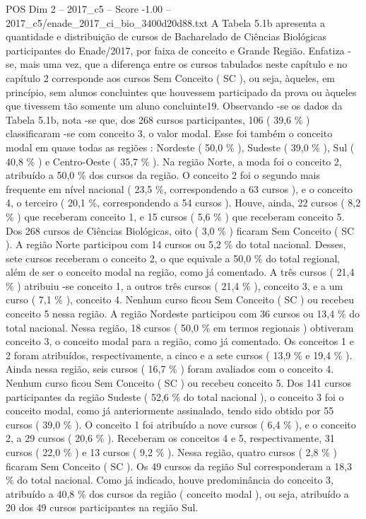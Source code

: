 \begin{textsample}{POS Dim 2 – 2017\_c5 – Score -1.00 – 2017\_c5/enade\_2017\_ci\_bio\_3400d20d88.txt}
A Tabela 5.1b apresenta a quantidade e distribuição de cursos de Bacharelado de Ciências Biológicas participantes do Enade/2017, por faixa de conceito e Grande Região.
Enfatiza -se, mais uma vez, que a diferença entre os cursos tabulados neste capítulo e no capítulo 2 corresponde aos cursos Sem Conceito ( SC ), ou seja, àqueles, em princípio, sem alunos concluintes que houvessem participado da prova ou àqueles que tivessem tão somente um aluno concluinte19.
Observando -se os dados da Tabela 5.1b, nota -se que, dos 268 cursos participantes, 106 ( 39,6 \% ) classificaram -se com conceito 3, o valor modal.
Esse foi também o conceito modal em quase todas as regiões : Nordeste ( 50,0 \% ), Sudeste ( 39,0 \% ), Sul ( 40,8 \% ) e Centro-Oeste ( 35,7 \% ).
Na região Norte, a moda foi o conceito 2, atribuído a 50,0 \% dos cursos da região.
O conceito 2 foi o segundo mais frequente em nível nacional ( 23,5 \%, correspondendo a 63 cursos ), e o conceito 4, o terceiro ( 20,1 \%, correspondendo a 54 cursos ).
Houve, ainda, 22 cursos ( 8,2 \% ) que receberam conceito 1, e 15 cursos ( 5,6 \% ) que receberam conceito 5.
Dos 268 cursos de Ciências Biológicas, oito ( 3,0 \% ) ficaram Sem Conceito ( SC ).
A região Norte participou com 14 cursos ou 5,2 \% do total nacional.
Desses, sete cursos receberam o conceito 2, o que equivale a 50,0 \% do total regional, além de ser o conceito modal na região, como já comentado.
A três cursos ( 21,4 \% ) atribuiu -se conceito 1, a outros três cursos ( 21,4 \% ), conceito 3, e a um curso ( 7,1 \% ), conceito 4.
Nenhum curso ficou Sem Conceito ( SC ) ou recebeu conceito 5 nessa região.
A região Nordeste participou com 36 cursos ou 13,4 \% do total nacional.
Nessa região, 18 cursos ( 50,0 \% em termos regionais ) obtiveram conceito 3, o conceito modal para a região, como já comentado.
Os conceitos 1 e 2 foram atribuídos, respectivamente, a cinco e a sete cursos ( 13,9 \% e 19,4 \% ).
Ainda nessa região, seis cursos ( 16,7 \% ) foram avaliados com o conceito 4.
Nenhum curso ficou Sem Conceito ( SC ) ou recebeu conceito 5.
Dos 141 cursos participantes da região Sudeste ( 52,6 \% do total nacional ), o conceito 3 foi o conceito modal, como já anteriormente assinalado, tendo sido obtido por 55 cursos ( 39,0 \% ).
O conceito 1 foi atribuído a nove cursos ( 6,4 \% ), e o conceito 2, a 29 cursos ( 20,6 \% ).
Receberam os conceitos 4 e 5, respectivamente, 31 cursos ( 22,0 \% ) e 13 cursos ( 9,2 \% ).
Nessa região, quatro cursos ( 2,8 \% ) ficaram Sem Conceito ( SC ).
Os 49 cursos da região Sul corresponderam a 18,3 \% do total nacional.
Como já indicado, houve predominância do conceito 3, atribuído a 40,8 \% dos cursos da região ( conceito modal ), ou seja, atribuído a 20 dos 49 cursos participantes na região Sul.

\end{textsample}
